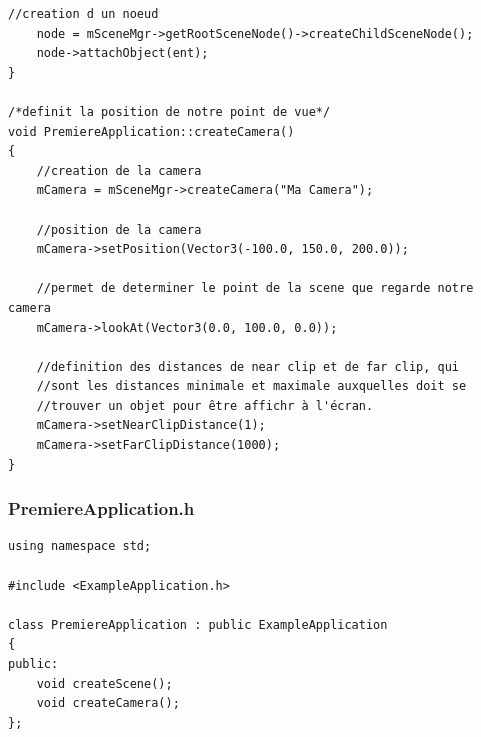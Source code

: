 \documentclass[10pt,a4paper]{report}
\begin{document}
\begin{lstlisting}[caption={PremiereApplication.cpp: Cr\'eation de la cam\'era}]
    //creation d un noeud
    node = mSceneMgr->getRootSceneNode()->createChildSceneNode();
    node->attachObject(ent);
}

/*definit la position de notre point de vue*/
void PremiereApplication::createCamera()
{
    //creation de la camera
    mCamera = mSceneMgr->createCamera("Ma Camera");

    //position de la camera
    mCamera->setPosition(Vector3(-100.0, 150.0, 200.0));

    //permet de determiner le point de la scene que regarde notre camera
    mCamera->lookAt(Vector3(0.0, 100.0, 0.0));

    //definition des distances de near clip et de far clip, qui
    //sont les distances minimale et maximale auxquelles doit se
    //trouver un objet pour être affichr à l'écran.
    mCamera->setNearClipDistance(1);
    mCamera->setFarClipDistance(1000);
}

\end{lstlisting}



\subsubsection{PremiereApplication.h}
\begin{lstlisting}[caption={PremiereApplication.h: Cr\'eation de la cam\'era}]
using namespace std;

#include <ExampleApplication.h>

class PremiereApplication : public ExampleApplication
{
public:
    void createScene();
    void createCamera();
};

\end{lstlisting}
\end{document}

